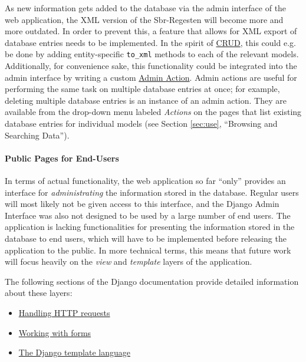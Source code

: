 As new information gets added to the database via the admin interface
of the web application, the XML version of the Sbr-Regesten will
become more and more outdated. In order to prevent this, a feature
that allows for XML export of database entries needs to be
implemented. In the spirit of
\href{https://en.wikipedia.org/wiki/CRUD}{CRUD}, this could e.g. be
done by adding entity-specific \texttt{to\_xml} methods to each of the
relevant models. Additionally, for convenience sake, this
functionality could be integrated into the admin interface by writing
a custom
\href{https://docs.djangoproject.com/en/1.4/ref/contrib/admin/actions/}{Admin
  Action}. Admin actions are useful for performing the same task on
multiple database entries at once; for example, deleting multiple
database entries is an instance of an admin action. They are available
from the drop-down menu labeled \emph{Actions} on the pages that list
existing database entries for individual models (see Section
\ref{sec:use}, ``Browsing and Searching Data'').

\paragraph{Public Pages for End-Users}

In terms of actual functionality, the web application so far ``only''
provides an interface for \emph{administrating} the information stored
in the database. Regular users will most likely not be given access to
this interface, and the Django Admin Interface was also not designed
to be used by a large number of end users. The application is lacking
functionalities for presenting the information stored in the database
to end users, which will have to be implemented before releasing the
application to the public. In more technical terms, this means that
future work will focus heavily on the \emph{view} and \emph{template}
layers of the application.

The following sections of the Django documentation provide detailed
information about these layers:

\begin{itemize}
\item
  \href{https://docs.djangoproject.com/en/1.4/topics/http/}{Handling
    HTTP requests}
\item
  \href{https://docs.djangoproject.com/en/1.4/topics/forms/}{Working
    with forms}
\item
  \href{https://docs.djangoproject.com/en/1.4/topics/templates/}{The
    Django template language}
\end{itemize}


